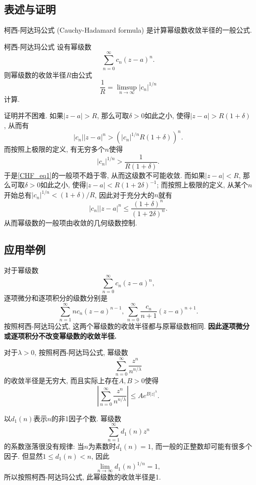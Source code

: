 
\subsection{表述与证明}

柯西-阿达玛公式 (Cauchy-Hadamard formula) 是计算幂级数收敛半径的一般公式.

\begin{theorem}{柯西-阿达玛公式}
设有幂级数
\begin{equation}\label{CHF_eq1}
\sum_{n=0}^\infty c_n(z-a)^n.
\end{equation}
则幂级数的收敛半径$R$由公式
$$
\frac{1}{R}=\limsup_{n\to\infty}|c_n|^{1/n}
$$
计算.
\end{theorem}
证明并不困难. 如果$|z-a|>R$, 那么可取$\delta>0$如此之小, 使得$|z-a|>R(1+\delta)$, 从而有
$$
|c_n||z-a|^n>(|c_n|^{1/n}R(1+\delta))^n.
$$
而按照上极限的定义, 有无穷多个$n$使得
$$
|c_n|^{1/n}>\frac{1}{R(1+\delta)}.
$$
于是\autoref{CHF_eq1}的一般项不趋于零, 从而这级数不可能收敛. 而如果$|z-a|<R$, 那么可取$\delta>0$如此之小, 使得$|z-a|<R(1+2\delta)^{-1}$; 而按照上极限的定义, 从某个$n$开始总有$|c_n|^{1/n}<(1+\delta)/R$, 因此对于充分大的$n$就有
$$
|c_n||z-a|^n\leq\frac{(1+\delta)^n}{(1+2\delta)^n}.
$$
从而幂级数的一般项由收敛的几何级数控制.

\subsection{应用举例}
对于幂级数
$$
\sum_{n=0}^\infty c_n(z-a)^n,
$$
逐项微分和逐项积分的级数分别是
$$
\sum_{n=1}^\infty nc_n(z-a)^{n-1},\,
\sum_{n=0}^\infty \frac{c_n}{n+1}(z-a)^{n+1}.
$$
按照柯西-阿达玛公式, 这两个幂级数的收敛半径都与原幂级数相同. \textbf{因此逐项微分或逐项积分不改变幂级数的收敛半径.}

对于$\lambda>0$, 按照柯西-阿达玛公式, 幂级数
$$
\sum_{n=0}^\infty\frac{z^n}{n^{n/\lambda}}
$$
的收敛半径是无穷大, 而且实际上存在$A,B>0$使得
$$
\left|\sum_{n=0}^\infty\frac{z^n}{n^{n/\lambda}}\right|
\leq Ae^{B|z|^\lambda}.
$$

以$d_1(n)$表示$n$的非1因子个数. 幂级数
$$
\sum_{n=1}^\infty d_1(n)z^n
$$
的系数涨落很没有规律: 当$n$为素数时$d_1(n)=1$, 而一般的正整数却可能有很多个因子. 但显然$1\leq d_1(n)<n$, 因此
$$
\lim_{n\to\infty}d_1(n)^{1/n}=1,
$$
所以按照柯西-阿达玛公式, 此幂级数的收敛半径是1.